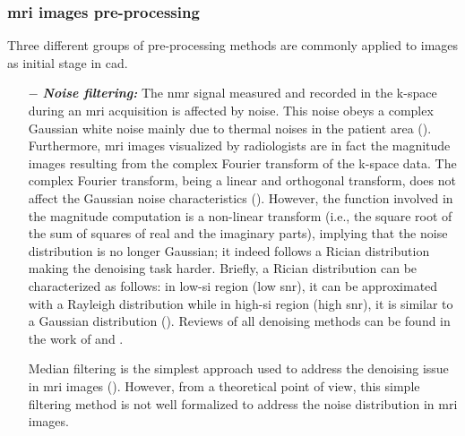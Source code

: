 \subsubsection{\ac{mri} images pre-processing}

Three different groups of pre-processing methods are commonly applied to images as initial stage in \ac{cad}.

\begin{enumerate}[leftmargin=*]


\item[$-$] \textbf{\textit{Noise filtering:}} The \ac{nmr} signal measured and recorded in the k-space during an \ac{mri} acquisition is affected by noise. This noise obeys a complex Gaussian white noise mainly due to thermal noises in the patient area (\cite{Nowak1999}). Furthermore, \ac{mri} images visualized by radiologists are in fact the magnitude images resulting from the complex Fourier transform of the k-space data. The complex Fourier transform, being a linear and orthogonal transform, does not affect the Gaussian noise characteristics (\cite{Nowak1999}). However, the function involved in the magnitude computation is a non-linear transform (i.e., the square root of the sum of squares of real and the imaginary parts), implying that the noise distribution is no longer Gaussian; it indeed follows a Rician distribution making the denoising task harder. Briefly, a Rician distribution can be characterized as follows: in low-\ac{si} region (low \ac{snr}), it can be approximated with a Rayleigh distribution while in high-\ac{si} region (high \ac{snr}), it is similar to a Gaussian distribution (\cite{Manjon2008}). Reviews of all denoising methods can be found in the work of \cite{Buades2005} and \cite{Mohan2014}.

Median filtering is the simplest approach used to address the denoising issue in \ac{mri} images (\cite{Ozer2009,Ozer2010}). %
However, from a theoretical point of view, this simple filtering method is not well formalized to address the noise distribution in \ac{mri} images.


\end{enumerate}
